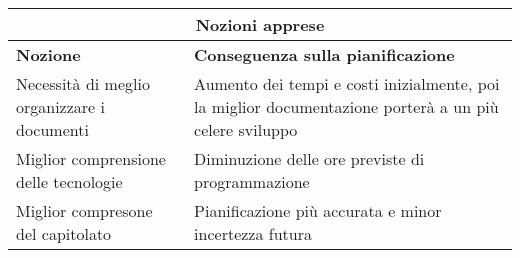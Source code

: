 \documentclass[a4paper, 12pt]{article}
\begin{document}
\begin{center}
    \begin{tabularx}{\textwidth}{|X|X|}
        \hline
        \multicolumn{2}{|c|}{\textbf{Nozioni apprese}}\\
        \hline
        \hline
        \textbf{Nozione} & \textbf{Conseguenza sulla pianificazione}\\
        \hline
        Necessità di meglio organizzare i documenti & Aumento dei tempi e costi inizialmente, poi la miglior documentazione porterà a un più celere sviluppo\\
        \hline
        Miglior comprensione delle tecnologie & Diminuzione delle ore previste di programmazione\\
        \hline
        Miglior compresone del capitolato & Pianificazione più accurata e minor incertezza futura\\
        \hline
    \end{tabularx}\\[8pt]
    \mbox{}\\
\end{center}
\end{document}
